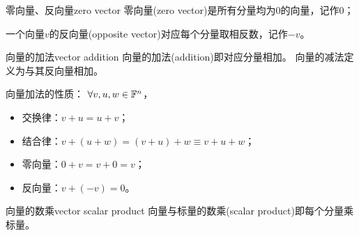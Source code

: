 \begin{definition}{零向量、反向量}{zero vector}
	零向量(zero vector)是所有分量均为0的向量，记作0；
	
	一个向量$v$的反向量(opposite vector)对应每个分量取相反数，记作$-v$。
\end{definition}


\begin{definition}{向量的加法}{vector addition}
	向量的加法(addition)即对应分量相加。
	向量的减法定义为与其反向量相加。
\end{definition}

\begin{corollary}
	向量加法的性质：%
	$\forall v,u,w \in \mathbb{F}^n$，
    \begin{itemize}
        \item 交换律：$v + u = u + v$；
        \item 结合律：$v + (u + w) = (v + u) + w \equiv v + u + w$；
        \item 零向量：$0 + v = v + 0 = v$；
        \item 反向量：$v + (-v) = 0$。
    \end{itemize}
\end{corollary}

\begin{definition}{向量的数乘}{vector scalar product}
	向量与标量的数乘(scalar product)即每个分量乘标量。
\end{definition}

